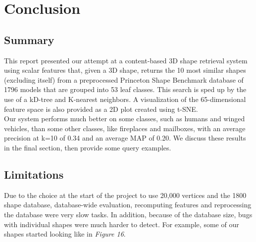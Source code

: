 \documentclass{bigdata}
\begin{document}
\section{Conclusion}
\subsection{Summary}
This report presented our attempt at a content-based 3D shape retrieval system using scalar features that, given a 3D shape, returns the 10 most similar shapes (excluding itself) from a preprocessed Princeton Shape Benchmark database of 1796 models that are grouped into 53 leaf classes. This search is sped up by the use of a kD-tree and K-nearest neighbors. A visualization of the 65-dimensional feature space is also provided as a 2D plot created using t-SNE. \\
Our system performs much better on some classes, such as humans and winged vehicles, than some other classes, like fireplaces and mailboxes, with an average precision at k=10 of 0.34 and an average MAP of 0.20. We discuss these results in the final section, then provide some query examples.

\subsection{Limitations}

Due to the choice at the start of the project to use 20,000 vertices and the 1800 shape database, database-wide evaluation, recomputing features and reprocessing the database were very slow tasks. In addition, because of the database size, bugs with individual shapes were much harder to detect. For example, some of our shapes started looking like in \textit{Figure 16}.
\end{document}
